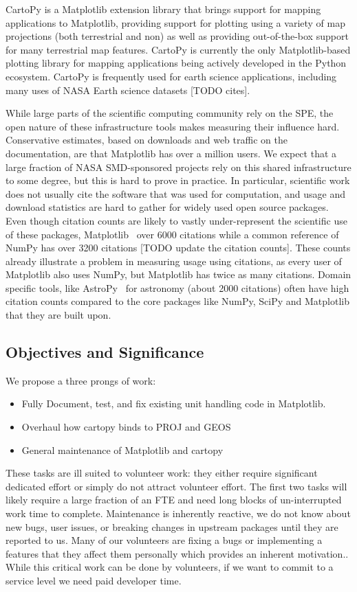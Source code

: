 \documentclass[12pt]{article}
\numberwithin{page}{section}
\begin{document}
CartoPy is a Matplotlib extension library that brings support for
mapping applications to Matplotlib, providing support for plotting
using a variety of map projections (both terrestrial and non) as well
as providing out-of-the-box support for many terrestrial map
features. CartoPy is currently the only Matplotlib-based plotting
library for mapping applications being actively developed in the
Python ecosystem. CartoPy is frequently used for earth science
applications, including many uses of NASA Earth science datasets [TODO cites].


While large parts of the scientific computing community rely on the
SPE, the open nature of these infrastructure tools makes measuring
their influence hard.  Conservative estimates, based on downloads and
web traffic on the documentation, are that Matplotlib has over a
million users.  We expect that a large fraction of NASA SMD-sponsored
projects rely on this shared infrastructure to some degree, but this
is hard to prove in practice.  In particular, scientific work does not
usually cite the software that was used for computation, and usage and
download statistics are hard to gather for widely used open source
packages.  Even though citation counts are likely to vastly
under-represent the scientific use of these packages,
Matplotlib~\cite{Hunter:2007} over 6000 citations while a common
reference of NumPy\cite{walt2011numpy} has over 3200 citations [TODO
  update the citation counts]. These counts already illustrate a
problem in measuring usage using citations, as every user of
Matplotlib also uses NumPy, but Matplotlib has twice as many
citations.  Domain specific tools, like
AstroPy~\cite{robitaille2013astropy} for astronomy (about 2000
citations) often have high citation counts compared to the core
packages like NumPy, SciPy and Matplotlib that they are built upon.


\subsection{Objectives and Significance}
We propose a three prongs of work:
\begin{itemize}
\item Fully Document, test, and fix existing unit handling code in Matplotlib.
\item Overhaul how cartopy binds to PROJ and GEOS
\item General maintenance of Matplotlib and cartopy
\end{itemize}
These tasks are ill suited to volunteer work: they either require
significant dedicated effort or simply do not attract volunteer
effort.  The first two tasks will likely require a large fraction of
an FTE and need long blocks of un-interrupted work time to complete.
Maintenance is inherently reactive, we do not know about new bugs,
user issues, or breaking changes in upstream packages until they are
reported to us.  Many of our volunteers are fixing a bugs or
implementing a features that they affect them personally which
provides an inherent motivation..  While this critical work can be
done by volunteers, if we want to commit to a service level we need
paid developer time.
\end{document}
